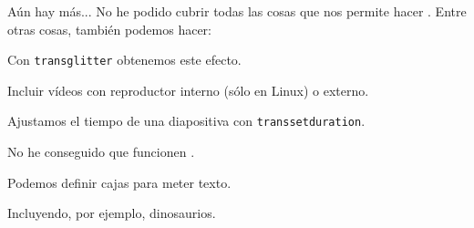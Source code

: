 \begin{frame}{Aún hay más...}
  \hypertarget{end}{}
  No he podido cubrir todas las cosas que nos permite hacer \beamer \frownie{}.
  Entre otras cosas, también podemos hacer:
  \espacio
  \begin{description}[<+->]
    \item[Transiciones] Con \texttt{transglitter} obtenemos este efecto.
    \item[Multimedia] Incluir vídeos con reproductor interno (sólo en Linux) o externo.
    \item[Temporización] Ajustamos el tiempo de una diapositiva con \texttt{transsetduration}.
    \item[Animaciones] No he conseguido que funcionen \frownie{}.
    \item[Cajas] Podemos definir cajas para meter texto.
    \item[Overlays de imágenes] Incluyendo, por ejemplo, dinosaurios.
  \end{description}
  \espacio

\end{frame}

